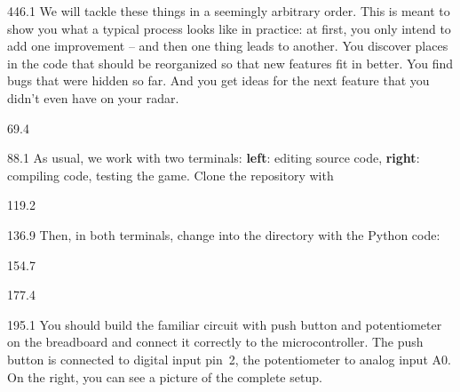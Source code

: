 \documentclass{aslab}
\begin{document}
\begin{region}[pitch=13.18]{446.1}
We will tackle these things in a seemingly arbitrary order. This is meant to
show you what a typical process looks like in practice: at first, you only
intend to add one improvement -- and then one thing leads to another. You
discover places in the code that should be reorganized so that new features
fit in better. You find bugs that were hidden so far. And you get ideas for
the next feature that you didn't even have on your radar.
\end{region}


\nextpage
\begin{region}{69.4}
\end{region}

\begin{region}[pitch=13.3]{88.1}
As usual, we work with two terminals: \textbf{left}: editing source code,
\textbf{right}: compiling code, testing the game. Clone the repository with
\end{region}

\begin{region}{119.2}
\end{region}

\begin{region}{136.9}
Then, in both terminals, change into the directory with the Python code:
\end{region}

\begin{region}{154.7}
\end{region}


\begin{region}[width=216]{177.4}
\end{region}

\begin{region}[width=216,pitch=13.17]{195.1}
You should build the familiar circuit with push button and potentiometer on
the breadboard and connect it correctly to the microcontroller. The push
button is connected to digital input pin~2, the potentiometer to analog
input A0. On the right, you can see a picture of the complete setup.
\end{region}
\end{document}
